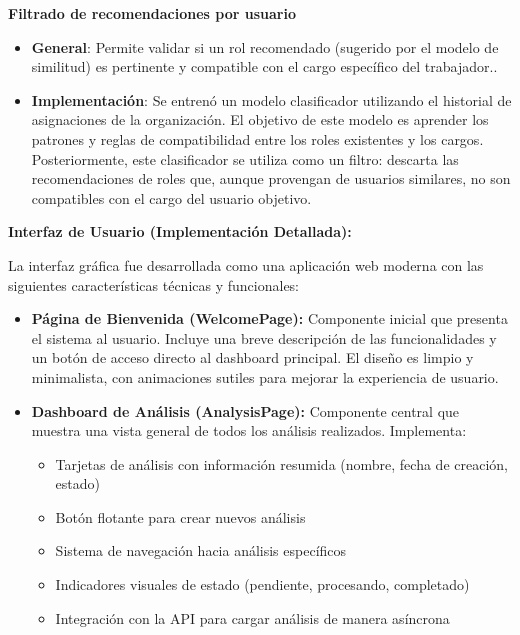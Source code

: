 \documentclass[11pt,letterpaper]{article}
\begin{document}
\begin{itemize}
\textbf{Filtrado de recomendaciones por usuario
}
\begin{itemize}
\tightlist
\item
  \textbf{General}: Permite validar si un rol recomendado (sugerido por
  el modelo de similitud) es pertinente y compatible con el cargo
  específico del trabajador..
\item
  \textbf{Implementación}: Se entrenó un modelo clasificador utilizando
  el historial de asignaciones de la organización. El objetivo de este
  modelo es aprender los patrones y reglas de compatibilidad entre los
  roles existentes y los cargos. Posteriormente, este clasificador se
  utiliza como un filtro: descarta las recomendaciones de roles que,
  aunque provengan de usuarios similares, no son compatibles con el
  cargo del usuario objetivo.
\end{itemize}

\textbf{Interfaz de Usuario (Implementación Detallada):}

La interfaz gráfica fue desarrollada como una aplicación web moderna con las siguientes características técnicas y funcionales:

\begin{itemize}
\item
  \textbf{Página de Bienvenida (WelcomePage):} Componente inicial que presenta el sistema 
  al usuario. Incluye una breve descripción de las funcionalidades y un botón de acceso 
  directo al dashboard principal. El diseño es limpio y minimalista, con animaciones sutiles 
  para mejorar la experiencia de usuario.

\item
  \textbf{Dashboard de Análisis (AnalysisPage):} Componente central que muestra una vista 
  general de todos los análisis realizados. Implementa:
  \begin{itemize}
  \item Tarjetas de análisis con información resumida (nombre, fecha de creación, estado)
  \item Botón flotante para crear nuevos análisis
  \item Sistema de navegación hacia análisis específicos
  \item Indicadores visuales de estado (pendiente, procesando, completado)
  \item Integración con la API para cargar análisis de manera asíncrona
  \end{itemize}


\end{itemize}
\end{itemize}
\end{document}
